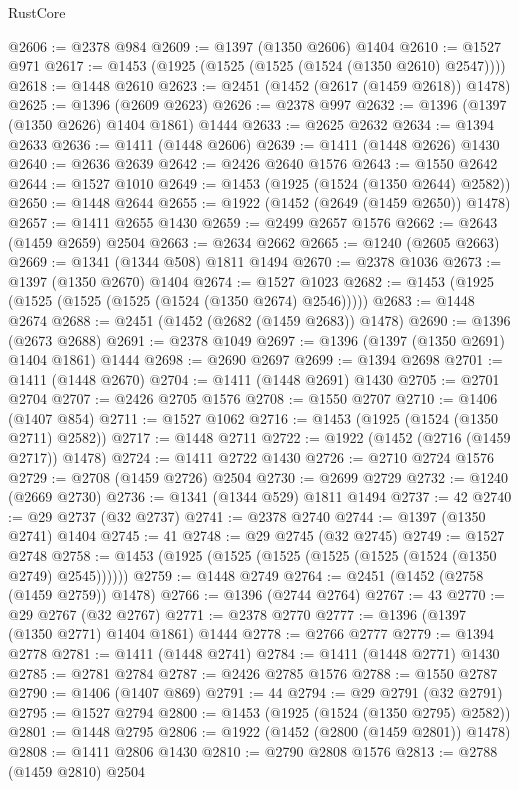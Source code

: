 \begin{lexlean}{RustCore}
\begin{coremodule}
@2606 := @2378 @984
@2609 := @1397 (@1350 @2606) @1404
@2610 := @1527 @971
@2617 := @1453 (@1925 (@1525 (@1525 (@1524 (@1350 @2610) @2547))))
@2618 := @1448 @2610
@2623 := @2451 (@1452 (@2617 (@1459 @2618)) @1478)
@2625 := @1396 (@2609 @2623)
@2626 := @2378 @997
@2632 := @1396 (@1397 (@1350 @2626) @1404 @1861) @1444
@2633 := @2625 @2632
@2634 := @1394 @2633
@2636 := @1411 (@1448 @2606)
@2639 := @1411 (@1448 @2626) @1430
@2640 := @2636 @2639
@2642 := @2426 @2640 @1576
@2643 := @1550 @2642
@2644 := @1527 @1010
@2649 := @1453 (@1925 (@1524 (@1350 @2644) @2582))
@2650 := @1448 @2644
@2655 := @1922 (@1452 (@2649 (@1459 @2650)) @1478)
@2657 := @1411 @2655 @1430
@2659 := @2499 @2657 @1576
@2662 := @2643 (@1459 @2659) @2504
@2663 := @2634 @2662
@2665 := @1240 (@2605 @2663)
@2669 := @1341 (@1344 @508) @1811 @1494
@2670 := @2378 @1036
@2673 := @1397 (@1350 @2670) @1404
@2674 := @1527 @1023
@2682 := @1453 (@1925 (@1525 (@1525 (@1525 (@1524 (@1350 @2674) @2546)))))
@2683 := @1448 @2674
@2688 := @2451 (@1452 (@2682 (@1459 @2683)) @1478)
@2690 := @1396 (@2673 @2688)
@2691 := @2378 @1049
@2697 := @1396 (@1397 (@1350 @2691) @1404 @1861) @1444
@2698 := @2690 @2697
@2699 := @1394 @2698
@2701 := @1411 (@1448 @2670)
@2704 := @1411 (@1448 @2691) @1430
@2705 := @2701 @2704
@2707 := @2426 @2705 @1576
@2708 := @1550 @2707
@2710 := @1406 (@1407 @854)
@2711 := @1527 @1062
@2716 := @1453 (@1925 (@1524 (@1350 @2711) @2582))
@2717 := @1448 @2711
@2722 := @1922 (@1452 (@2716 (@1459 @2717)) @1478)
@2724 := @1411 @2722 @1430
@2726 := @2710 @2724 @1576
@2729 := @2708 (@1459 @2726) @2504
@2730 := @2699 @2729
@2732 := @1240 (@2669 @2730)
@2736 := @1341 (@1344 @529) @1811 @1494
@2737 := 42
@2740 := @29 @2737 (@32 @2737)
@2741 := @2378 @2740
@2744 := @1397 (@1350 @2741) @1404
@2745 := 41
@2748 := @29 @2745 (@32 @2745)
@2749 := @1527 @2748
@2758 := @1453 (@1925 (@1525 (@1525 (@1525 (@1525 (@1524 (@1350 @2749) @2545))))))
@2759 := @1448 @2749
@2764 := @2451 (@1452 (@2758 (@1459 @2759)) @1478)
@2766 := @1396 (@2744 @2764)
@2767 := 43
@2770 := @29 @2767 (@32 @2767)
@2771 := @2378 @2770
@2777 := @1396 (@1397 (@1350 @2771) @1404 @1861) @1444
@2778 := @2766 @2777
@2779 := @1394 @2778
@2781 := @1411 (@1448 @2741)
@2784 := @1411 (@1448 @2771) @1430
@2785 := @2781 @2784
@2787 := @2426 @2785 @1576
@2788 := @1550 @2787
@2790 := @1406 (@1407 @869)
@2791 := 44
@2794 := @29 @2791 (@32 @2791)
@2795 := @1527 @2794
@2800 := @1453 (@1925 (@1524 (@1350 @2795) @2582))
@2801 := @1448 @2795
@2806 := @1922 (@1452 (@2800 (@1459 @2801)) @1478)
@2808 := @1411 @2806 @1430
@2810 := @2790 @2808 @1576
@2813 := @2788 (@1459 @2810) @2504

\end{coremodule}
\end{lexlean}

